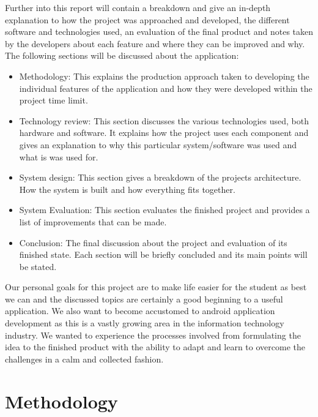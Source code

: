 Further into this report will contain a breakdown and give an in-depth explanation to how the project was approached and developed, the different software and technologies used, an evaluation of the final product and notes taken by the developers about each feature and where they can be improved and why. The following sections will be discussed about the application:
\begin{itemize}
\item Methodology: This explains the production approach taken to developing the individual features of the application and how they were developed within the project time limit.
\item Technology review: This section discusses the various technologies used, both hardware and software. It explains how the project uses each component and gives an explanation to why this particular system/software was used and what is was used for.
\item System design: This section gives a breakdown of the projects architecture. How the system is built and how everything fits together.
\item System Evaluation: This section evaluates the finished project and provides a list of improvements that can be made.
\item Conclusion: The final discussion about the project and evaluation of its finished state. Each section will be briefly concluded and its main points will be stated.
\end{itemize}

Our personal goals for this project are to make life easier for the student as best we can and the discussed topics are certainly a good beginning to a useful application. We also want to become accustomed to android application development as this is a vastly growing area in the information technology industry. We wanted to experience the processes involved from formulating the idea to the finished product with the ability to adapt and learn to overcome the challenges in a calm and collected fashion.

\chapter{Methodology}
